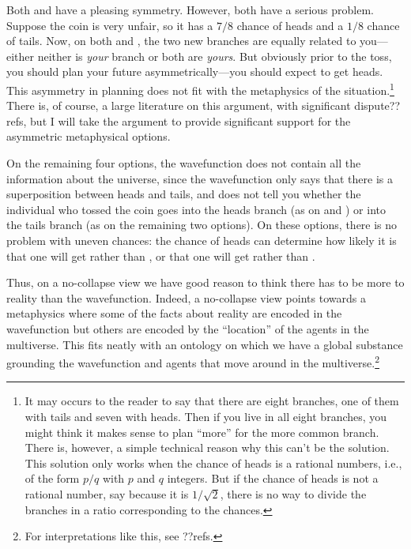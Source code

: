 Both  and  have a pleasing symmetry. However, both have a serious problem.
Suppose the coin is very unfair, so it has a $7/8$ chance of heads and a $1/8$ chance of tails. Now, on both 
 and , the two new branches are equally related to you---either neither is 
\textit{your} branch or both are \textit{yours}. But obviously prior to the toss, you should plan your future 
asymmetrically---you should expect to get heads. This asymmetry in planning does not fit with the metaphysics 
of the situation.\footnote{It may occurs to the reader to say that there are eight branches, one of them with 
tails and seven with heads. Then if you live in all eight branches, you might think it makes sense to plan 
``more'' for the more common branch. There is, however, a simple technical reason why this can't be the solution.
This solution only works when the chance of heads is a rational numbers, i.e., of the form $p/q$ with $p$ and $q$ integers.
But if the chance of heads is not a rational number, say because it is $1/\sqrt{2}$, there is no way to divide 
the branches in a ratio corresponding to the chances.} There is, of course, a large literature on this argument, with significant dispute??refs, but I will take the argument to provide significant support for the asymmetric metaphysical options. 

On the remaining four options, the wavefunction does not contain all the information about the universe, since the wavefunction
only says that there is a superposition between heads and tails, and does not tell you whether the individual who tossed
the coin goes into the heads branch (as on  and ) or into the tails branch (as on
the remaining two options). On these options, there is no problem with uneven chances: the chance of heads can determine 
how likely it is that one will get  rather than , or that one will get 
 rather than .

Thus, on a no-collapse view we have good reason to think there has to be more to reality 
than the wavefunction. Indeed, a no-collapse view points towards a metaphysics where some of the facts about 
reality are encoded in the wavefunction but others are encoded by the ``location'' of the agents in the multiverse.
This fits neatly with an ontology on which we have a global substance grounding the wavefunction and agents that 
move around in the multiverse.\footnote{For interpretations like this, see ??refs.}

